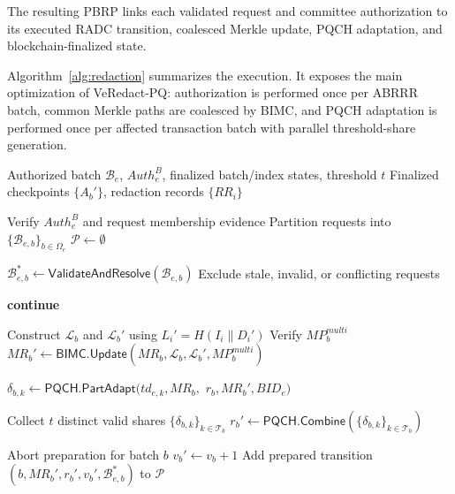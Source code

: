 \documentclass[lettersize,journal]{IEEEtran}
\begin{document}
The resulting PBRP links each validated
request and committee authorization to
its executed RADC transition, coalesced
Merkle update, PQCH adaptation, and
blockchain-finalized state.


Algorithm~\ref{alg:redaction} summarizes the execution. It exposes the
main optimization of VeRedact-PQ: authorization is performed once per
ABRRR batch, common Merkle paths are coalesced by BIMC, and PQCH
adaptation is performed once per affected transaction batch with
parallel threshold-share generation.


\begin{algorithm}[t]
\caption{Authorized Batch Redaction and
Verifiable State Update}
\label{alg:redaction}
\begin{algorithmic}[1]
\Require Authorized batch $\mathcal{B}_e$,
$Auth_e^B$, finalized batch/index states,
threshold $t$
\Ensure Finalized checkpoints $\{A_b'\}$,
redaction records $\{RR_i\}$

\State Verify $Auth_e^B$ and request
membership evidence
\State Partition requests into
$\{\mathcal{B}_{e,b}\}_{b\in\Omega_e}$
\State $\mathcal{P}\gets\emptyset$

    \State $\mathcal{B}_{e,b}^{*}\gets
    \mathsf{ValidateAndResolve}
    (\mathcal{B}_{e,b})$
    \State Exclude stale, invalid, or
    conflicting requests

        \State \textbf{continue}
    \EndIf

    \State Construct $\mathcal{L}_b$ and
    $\mathcal{L}_b'$ using
    $L_i'=H(I_i\parallel D_i')$
    \State Verify $MP_b^{multi}$
    \State $MR_b'\gets
    \mathsf{BIMC.Update}
    (MR_b,\mathcal{L}_b,\mathcal{L}_b',
    MP_b^{multi})$

        \State $\delta_{b,k}\gets
        \mathsf{PQCH.PartAdapt}(td_{e,k},MR_b,$
        \Statex \hspace{3.2em}$r_b,MR_b',BID_e)$
    \EndFor

    \State Collect $t$ distinct valid shares
    $\{\delta_{b,k}\}_{k\in\mathcal{T}_b}$
    \State $r_b'\gets
    \mathsf{PQCH.Combine}
    (\{\delta_{b,k}\}_{k\in\mathcal{T}_b})$

        \State Abort preparation
        for batch $b$
    \Else
        \State $v_b'\gets v_b+1$
        \State Add prepared transition
        $(b,MR_b',r_b',v_b',
        \mathcal{B}_{e,b}^{*})$ to
        $\mathcal{P}$
    \EndIf
\EndFor


\end{algorithmic}
\end{algorithm}
\end{document}
